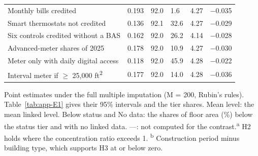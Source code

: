 \begin{table}[!htbp]
\begin{tabular}{L{6.7cm}L{1.02cm}L{1.02cm}L{1.02cm}L{1.02cm}L{1.15cm}}
Monthly bills credited & 0.193 & 92.0 & 1.6 & 4.27 & $-$0.035 \\
Smart thermostats not credited & 0.136 & 92.1 & 32.6 & 4.27 & $-$0.029 \\
Six controls credited without a BAS & 0.162 & 92.0 & 26.2 & 4.14 & $-$0.028 \\
Advanced-meter shares of 2025 & 0.178 & 92.0 & 10.9 & 4.27 & $-$0.030 \\
Meter only with daily digital access & 0.118 & 92.0 & 45.9 & 4.28 & $-$0.022 \\
Interval meter if $\geq$ 25,000 ft\textsuperscript{2} & 0.177 & 92.0 & 14.0 & 4.28 & $-$0.036 \\
\bottomrule
\end{tabular}
\par\smallskip\parbox{\textwidth}{\footnotesize Point estimates under the full multiple imputation (M = 200, Rubin's rules). Table~\ref{tab:app-E1} gives their 95\% intervals and the tier shares. Mean level: the mean linked level. Below status and No data: the shares of floor area (\%) below the status tier and with no linked data. —: not computed for the contrast.\newline \textsuperscript{a} H2 holds where the concentration ratio exceeds 1. \textsuperscript{b} Construction period minus building type, which supports H3 at or below zero.}
\end{table}
